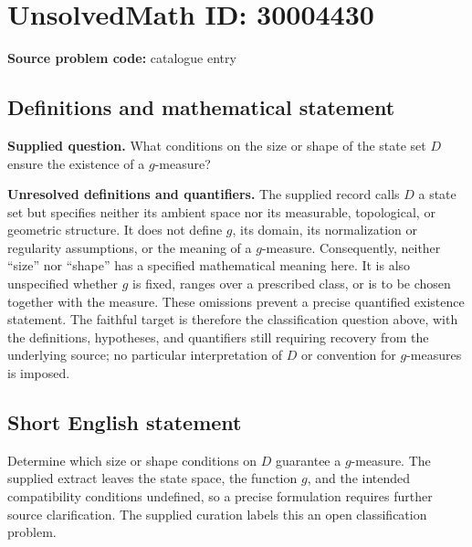 \documentclass[11pt]{article}
\begin{document}
\section*{UnsolvedMath ID: 30004430}
\textbf{Source problem code:} catalogue entry
\subsection{Definitions and mathematical statement}
\textbf{Supplied question.} What conditions on the size or shape of the state set \(D\) ensure the existence of a \(g\)-measure?

\textbf{Unresolved definitions and quantifiers.} The supplied record calls \(D\) a state set but specifies neither its ambient space nor its measurable, topological, or geometric structure. It does not define \(g\), its domain, its normalization or regularity assumptions, or the meaning of a \(g\)-measure. Consequently, neither ``size'' nor ``shape'' has a specified mathematical meaning here. It is also unspecified whether \(g\) is fixed, ranges over a prescribed class, or is to be chosen together with the measure. These omissions prevent a precise quantified existence statement. The faithful target is therefore the classification question above, with the definitions, hypotheses, and quantifiers still requiring recovery from the underlying source; no particular interpretation of \(D\) or convention for \(g\)-measures is imposed.
\subsection{Short English statement}
Determine which size or shape conditions on \(D\) guarantee a \(g\)-measure. The supplied extract leaves the state space, the function \(g\), and the intended compatibility conditions undefined, so a precise formulation requires further source clarification. The supplied curation labels this an open classification problem.
\end{document}
